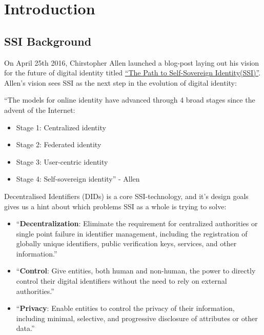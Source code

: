 \hypertarget{introduction}{%
\chapter{Introduction}\label{introduction}}

\hypertarget{ssi-background}{%
\section{SSI Background}\label{ssi-background}}

On April 25th 2016, Chirstopher Allen launched a blog-post laying out
his vision for the future of digital identity titled
\href{http://www.lifewithalacrity.com/2016/04/the-path-to-self-soverereign-identity.html}{``The
Path to Self-Sovereign Identity(SSI)''}. Allen's vision sees SSI as the next
step in the evolution of digital identity: 

``The models for online
identity have advanced through 4 broad stages since the advent of the
Internet:

\begin{itemize}
\tightlist
\item
  Stage 1: Centralized identity
\item
  Stage 2: Federated identity
\item
  Stage 3: User-centric identity
\item
  Stage 4: Self-sovereign identity'' - Allen
\end{itemize}

Decentralised Identifiers (DIDs) is a core SSI-technology, and it's
design goals gives us a hint about which problems SSI as a whole is
trying to solve:

\begin{itemize}
\tightlist
\item
  ``\textbf{Decentralization}: Eliminate the requirement for centralized
  authorities or single point failure in identifier management,
  including the registration of globally unique identifiers, public
  verification keys, services, and other information.''
\item
  ``\textbf{Control}: Give entities, both human and non-human, the power
  to directly control their digital identifiers without the need to rely
  on external authorities.''
\item
  ``\textbf{Privacy}: Enable entities to control the privacy of their
  information, including minimal, selective, and progressive disclosure
  of attributes or other data.''
\end{itemize}



